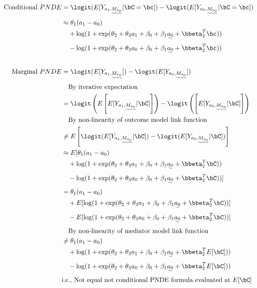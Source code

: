 \documentclass[dvipdfmx,10pt]{article}
\begin{document}
\begin{align*}
  \text{Conditional }PNDE
  &= \logit(E[Y_{a_{1},\uwave{M_{a_{0}}}} | \bC = \bc]) - \logit(E[Y_{a_{0},\uwave{M_{a_{0}}}} | \bC = \bc])\\
  &\approx \theta_{1}(a_{1} - a_{0})\\
  &~~~ + \log(1 + \exp(\theta_{2} + \theta_{3}a_{1} + \beta_{0} + \beta_{1} \uwave{a_{0}} + \bbeta_{2}^T\bc))\\
  &~~~ - \log(1 + \exp(\theta_{2} + \theta_{3}a_{0} + \beta_{0} + \beta_{1} \uwave{a_{0}} + \bbeta_{2}^T\bc))\\
  \\
  \text{Marginal }PNDE
  &= \logit(E[Y_{a_{1},\uwave{M_{a_{0}}}}]) - \logit(E[Y_{a_{0},\uwave{M_{a_{0}}}}])\\
  &~~~\text{By iterative expectation}\\
  &= \logit\left(E \left[ E[Y_{a_{1},\uwave{M_{a_{0}}}} | \bC] \right]\right) - \logit\left(\left[ E[Y_{a_{0},\uwave{M_{a_{0}}}} | \bC] \right]\right)\\
  &~~~\text{By non-linearity of outcome model link function}\\
  &\ne E \left[ \logit(E[Y_{a_{1},\uwave{M_{a_{0}}}} | \bC]) - \logit(E[Y_{a_{0},\uwave{M_{a_{0}}}} | \bC]) \right]\\
  &\approx E[ \theta_{1}(a_{1} - a_{0})\\
  &~~~ + \log(1 + \exp(\theta_{2} + \theta_{3}a_{1} + \beta_{0} + \beta_{1} \uwave{a_{0}} + \bbeta_{2}^T\bC))\\
  &~~~ - \log(1 + \exp(\theta_{2} + \theta_{3}a_{0} + \beta_{0} + \beta_{1} \uwave{a_{0}} + \bbeta_{2}^T\bC))]\\
  &= \theta_{1}(a_{1} - a_{0})\\
  &~~~ + E[\log(1 + \exp(\theta_{2} + \theta_{3}a_{1} + \beta_{0} + \beta_{1} \uwave{a_{0}} + \bbeta_{2}^T\bC))]\\
  &~~~ - E[\log(1 + \exp(\theta_{2} + \theta_{3}a_{0} + \beta_{0} + \beta_{1} \uwave{a_{0}} + \bbeta_{2}^T\bC))]\\
  &~~~\text{By non-linearity of mediator model link function}\\
  &\ne \theta_{1}(a_{1} - a_{0})\\
  &~~~ + \log(1 + \exp(\theta_{2} + \theta_{3}a_{1} + \beta_{0} + \beta_{1} \uwave{a_{0}} + \bbeta_{2}^TE[\bC]))\\
  &~~~ - \log(1 + \exp(\theta_{2} + \theta_{3}a_{0} + \beta_{0} + \beta_{1} \uwave{a_{0}} + \bbeta_{2}^TE[\bC]))\\
  &\text{i.e., Not equal not conditional PNDE formula evaluated at }E[\bC]\\
\end{align*}
\end{document}
